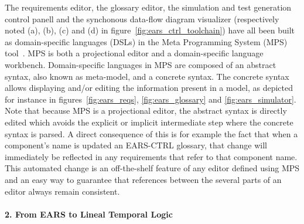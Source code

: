 The requirements editor, the glossary editor, the simulation and test generation
control panell and the synchonous data-flow diagram visualizer (respectively
noted (\textsf{a}), (\textsf{b}), (\textsf{c}) and (\textsf{d}) in figure~\ref{fig:ears_ctrl_toolchain}) have all been built as 
domain-specific languages (DSLs) in the Meta Programming System (MPS)
tool~\cite{mps}.
MPS is both a projectional editor and a domain-specific language workbench.
Domain-specific languages in MPS are composed of an abstract syntax, also known
as meta-model, and a concrete syntax. The concrete syntax allows displaying
and/or editing the information present in a model, as depicted for instance in
figures~\ref{fig:ears_reqs}, \ref{fig:ears_glossary} and
\ref{fig:ears_simulator}. Note that because MPS is a projectional editor, the
abstract syntax is directly edited which avoids the explicit or implicit
intermediate step where the concrete syntax is parsed.
A direct consequence of this is for example the fact that when a component's
name is updated an \textsf{EARS-CTRL} glossary, that change will immediately be
reflected in any requirements that refer to that component name. This automated
change is an off-the-shelf feature of any editor defined using MPS and an easy
way to guarantee that references between the several parts of an editor always remain consistent.

\paragraph{2. From EARS to Lineal Temporal Logic\\\\}
\label{sec:ears_LTL} 

